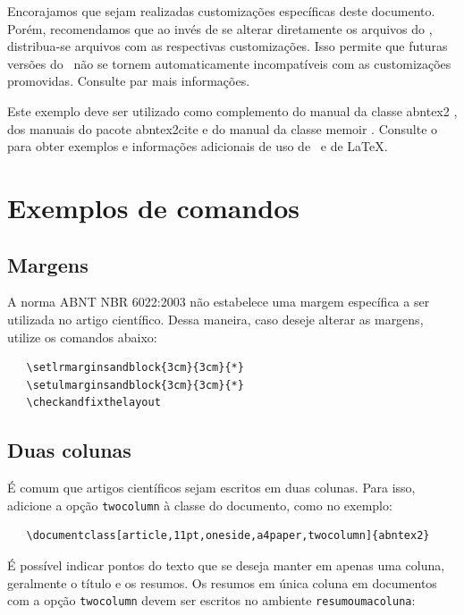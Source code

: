 \documentclass{Article_Class_RevInfor}
\begin{document}
Encorajamos que sejam realizadas customizações específicas deste documento.
Porém, recomendamos que ao invés de se alterar diretamente os arquivos do
\abnTeX, distribua-se arquivos com as respectivas customizações. Isso permite
que futuras versões do \abnTeX~não se tornem automaticamente incompatíveis com
as customizações promovidas. Consulte 
par mais informações.

Este exemplo deve ser utilizado como complemento do manual da classe
\textsf{abntex2} \cite{abntex2classe}, dos manuais do pacote
\textsf{abntex2cite} \cite{abntex2cite,abntex2cite-alf} e do manual da classe
\textsf{memoir} \cite{memoir}. Consulte o  para obter
exemplos e informações adicionais de uso de \abnTeX\ e de \LaTeX.

\section{Exemplos de comandos}

\subsection{Margens}

A norma ABNT NBR 6022:2003 não estabelece uma margem específica a ser utilizada
no artigo científico. Dessa maneira, caso deseje alterar as margens, utilize os
comandos abaixo:

\begin{verbatim}
   \setlrmarginsandblock{3cm}{3cm}{*}
   \setulmarginsandblock{3cm}{3cm}{*}
   \checkandfixthelayout
\end{verbatim}

\subsection{Duas colunas}

É comum que artigos científicos sejam escritos em duas colunas. Para isso,
adicione a opção \texttt{twocolumn} à classe do documento, como no exemplo:

\begin{verbatim}
   \documentclass[article,11pt,oneside,a4paper,twocolumn]{abntex2}
\end{verbatim}

É possível indicar pontos do texto que se deseja manter em apenas uma coluna,
geralmente o título e os resumos. Os resumos em única coluna em documentos com
a opção \texttt{twocolumn} devem ser escritos no ambiente
\texttt{resumoumacoluna}:
\end{document}
